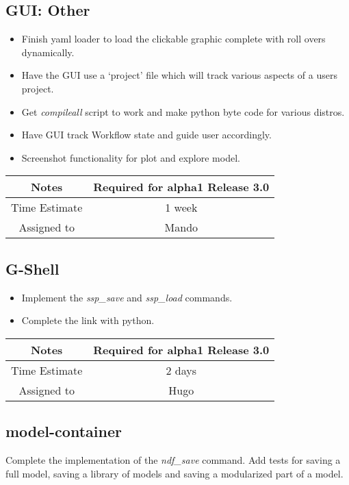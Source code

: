 \documentclass[12pt]{article}
\begin{document}
\subsection{GUI: Other}
\begin{itemize}
\item Finish yaml loader to load the clickable graphic complete with
  roll overs dynamically.
\item Have the GUI use a `project' file which will track various
  aspects of a users project.
\item Get {\it compileall} script to work and make python byte code for
  various distros.
\item Have GUI track Workflow state and guide user accordingly.
\item Screenshot functionality for plot and explore model.
\end{itemize}

{
  \vspace{5mm}
  \centering
  \begin{tabular}{|c|c|}
    \hline
    Notes
    & Required for alpha1 Release 3.0 \\
    \hline
    Time Estimate
    & 1 week \\
    \hline
    Assigned to
    & Mando \\
    \hline
  \end{tabular}
}


\subsection{G-Shell}
\begin{itemize}
\item Implement the {\it ssp\_save} and {\it ssp\_load} commands.
\item Complete the link with python.
\end{itemize}

{
  \vspace{5mm}
  \centering
  \begin{tabular}{|c|c|}
    \hline
    Notes
    & Required for alpha1 Release 3.0 \\
    \hline
    Time Estimate
    & 2 days \\
    \hline
    Assigned to
    & Hugo \\
    \hline
  \end{tabular}
}


\subsection{model-container}
Complete the implementation of the {\it ndf\_save} command.  Add tests for
saving a full model, saving a library of models and saving a
modularized part of a model.
\end{document}
